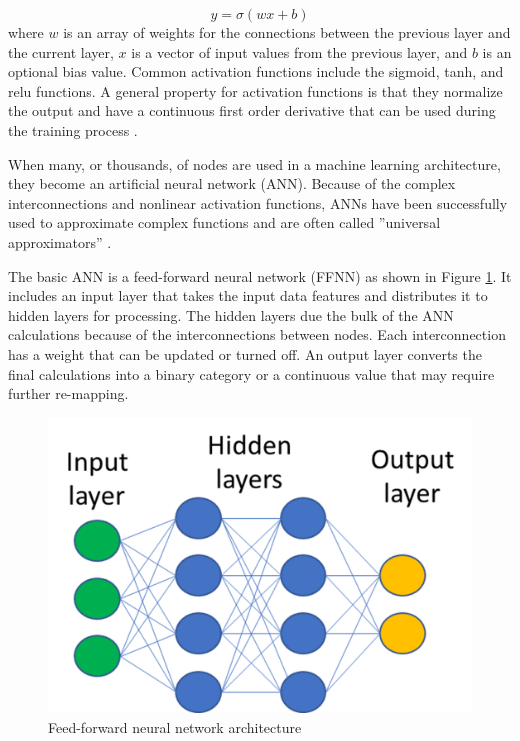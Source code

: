 \documentclass[10pt,a4paper,twocolumn]{article}
\begin{document}
\begin{equation}
\label{eq:perceptron}
y= \sigma(wx+b)
\end{equation}
\noindent
where $w$ is an array of weights for the connections between the previous layer and the current layer, $x$ is a vector of input values from the previous layer, and $b$ is an optional bias value. Common activation functions include the sigmoid, tanh, and relu functions. A general property for activation functions is that they normalize the output and have a continuous first order derivative that can be used during the training process \cite{Goodfellow2016}. 

When many, or thousands, of nodes are used in a machine learning architecture, they become an artificial neural network (ANN). Because of the complex interconnections and nonlinear activation functions, ANNs have been successfully used to approximate complex functions and are often called ''universal approximators'' \cite{Sifaoui2008, Sonoda2017}. 

The basic ANN is a feed-forward neural network (FFNN) as shown in Figure \ref{fig:ffnn}. It includes an input layer that takes the input data features and distributes it to hidden layers for processing. The hidden layers due the bulk of the ANN calculations because of the interconnections between nodes. Each interconnection has a weight that can be updated or turned off. An output layer converts the final calculations into a binary category or a continuous value that may require further re-mapping.

\begin{figure}[]
\centering
\includegraphics[width=\columnwidth]{images/ffnn.png}  %
\caption{Feed-forward neural network architecture}
\label{fig:ffnn}
\end{figure}
%
\end{document}

